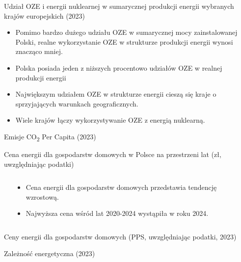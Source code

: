 \begin{frame}
{Udział OZE i energii nuklearnej w sumarycznej produkcji energii wybranych krajów europejskich (2023)}
\begin{itemize}
    \item Pomimo bardzo dużego udziału OZE w sumarycznej mocy zainstalowanej Polski, realne wykorzystanie OZE w strukturze produkcji energii wynosi znacząco mniej.
    \item Polska posiada jeden z niższych procentowo udziałów OZE w realnej produkcji energii
    \item Największym udziałem OZE w strukturze energii cieszą się kraje o sprzyjających warunkach geograficznych.
    \item Wiele krajów łączy wykorzystywanie OZE z energią nuklearną.
    \end{itemize}
\end{frame}

\begin{frame}{Emisje CO\textsubscript{2} Per Capita (2023)}
\end{frame}

\begin{frame}{Cena energii dla gospodarstw domowych w Polsce na przestrzeni lat (zł, uwzględniając podatki)}
\begin{columns}

\begin{column}{0.6\textwidth}
\end{column}

\begin{column}{0.4\textwidth}
    \begin{itemize}
        \item Cena energii dla gospodarstw domowych przedstawia tendencję wzrostową.
        \item Najwyższa cena wśród lat 2020-2024 wystąpiła w roku 2024.
    \end{itemize}
\end{column}

\end{columns}
\end{frame}

\begin{frame}{Ceny energii dla gospodarstw domowych (PPS, uwzględniając podatki, 2023)}
\end{frame}

\begin{frame}{Zależność energetyczna (2023)}
\end{frame}


